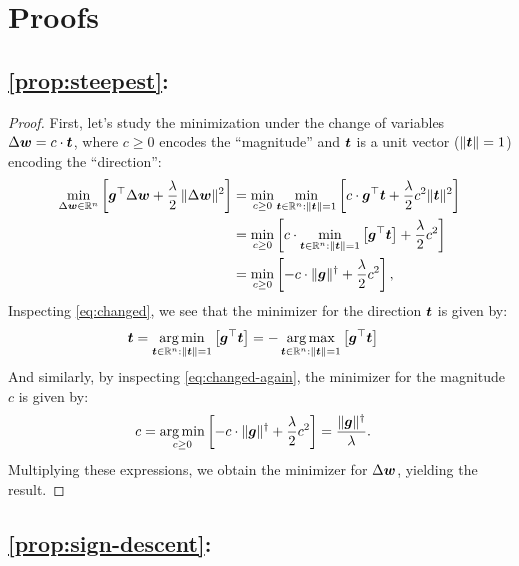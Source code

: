 \section{Proofs}

\renewcommand{\proofname}{\hspace{-0.315em}}

\subsection*{\cref{prop:steepest}: } \label{proof:steepest}

\begin{proof}
First, let's study the minimization under the change of variables $\Delta {\bm{w}} = c \cdot {\bm{t}}$, where $c \geq 0$ encodes the ``magnitude'' and ${\bm{t}}$ is a unit vector ($\Vert {{\bm{t}}} \Vert=1$) encoding the ``direction'':
\begin{align}
    \min_{\Delta {\bm{w}} \in \mathbb{R}^n} \left[{\bm{g}}^\top \Delta {\bm{w}} + \frac{\lambda}{2} \, \Vert {\Delta {\bm{w}}} \Vert^2 \right] &= \min_{c \geq 0} \min_{{\bm{t}}\in\mathbb{R}^n : \Vert {{\bm{t}}} \Vert=1} \left[c \cdot {\bm{g}}^\top {\bm{t}} + \frac{\lambda}{2} c^2 \Vert {{\bm{t}}} \Vert^2 \right] \\
    &= \min_{c \geq 0} \left[c \cdot \min_{{\bm{t}}\in\mathbb{R}^n : \Vert {{\bm{t}}} \Vert=1} \left[{\bm{g}}^\top {\bm{t}}\right] + \frac{\lambda}{2} c^2 \right] \label{eq:changed} \\
    &= \min_{c \geq 0} \left[ - c \cdot \Vert {{\bm{g}}} \Vert^\dagger+ \frac{\lambda}{2} c^2 \right], \label{eq:changed-again}
\end{align}
Inspecting \cref{eq:changed}, we see that the minimizer for the direction ${\bm{t}}$ is given by:
\begin{align}
    {\bm{t}} &= \operatorname*{arg\,min}_{{\bm{t}}\in\mathbb{R}^n : \Vert {{\bm{t}}} \Vert=1} \left[{\bm{g}}^\top {\bm{t}}\right] = - \operatorname*{arg\,max}_{{\bm{t}}\in\mathbb{R}^n : \Vert {{\bm{t}}} \Vert=1} \left[{\bm{g}}^\top {\bm{t}}\right]
\end{align}
And similarly, by inspecting \cref{eq:changed-again}, the minimizer for the magnitude $c$ is given by:
\begin{align}
    c &= \operatorname*{arg\,min}_{c \geq 0} \left[ - c \cdot \Vert {{\bm{g}}} \Vert^\dagger + \frac{\lambda}{2} c^2 \right] = \frac{\Vert {{\bm{g}}} \Vert^\dagger}{\lambda}.
\end{align}
Multiplying these expressions, we obtain the minimizer for $\Delta {\bm{w}}$, yielding the result.
\end{proof}




\subsection*{\cref{prop:sign-descent}: } \label{proof:sign-descent}

